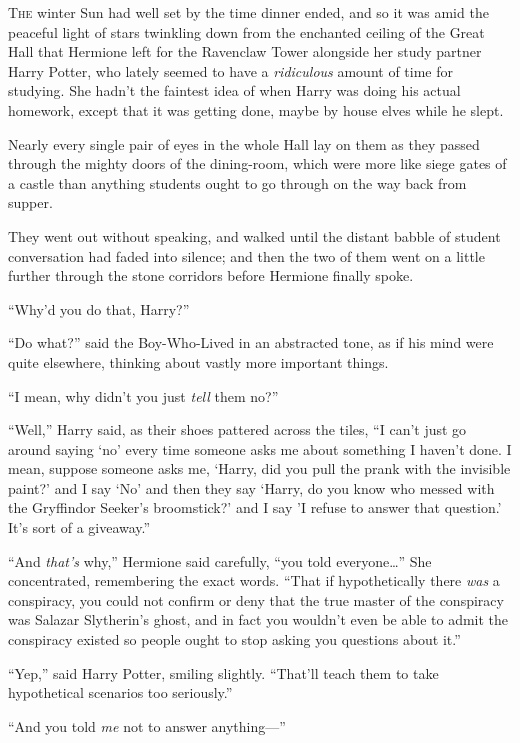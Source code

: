 
\lettrine{T}{he} winter Sun had well set by the time dinner ended, and so it was amid the peaceful light of stars twinkling down from the enchanted ceiling of the Great Hall that Hermione left for the Ravenclaw Tower alongside her study partner Harry Potter, who lately seemed to have a \emph{ridiculous} amount of time for studying. She hadn’t the faintest idea of when Harry was doing his actual homework, except that it was getting done, maybe by house elves while he slept.

Nearly every single pair of eyes in the whole Hall lay on them as they passed through the mighty doors of the dining-room, which were more like siege gates of a castle than anything students ought to go through on the way back from supper.

They went out without speaking, and walked until the distant babble of student conversation had faded into silence; and then the two of them went on a little further through the stone corridors before Hermione finally spoke.

“Why’d you do that, Harry?”

“Do what?” said the Boy-Who-Lived in an abstracted tone, as if his mind were quite elsewhere, thinking about vastly more important things.

“I mean, why didn’t you just \emph{tell} them no?”

“Well,” Harry said, as their shoes pattered across the tiles, “I can’t just go around saying ‘no’ every time someone asks me about something I haven’t done. I mean, suppose someone asks me, ‘Harry, did you pull the prank with the invisible paint?’ and I say ‘No’ and then they say ‘Harry, do you know who messed with the Gryffindor Seeker’s broomstick?’ and I say ’I refuse to answer that question.’ It’s sort of a giveaway.”

“And \emph{that’s} why,” Hermione said carefully, “you told everyone…” She concentrated, remembering the exact words. “That if hypothetically there \emph{was} a conspiracy, you could not confirm or deny that the true master of the conspiracy was Salazar Slytherin’s ghost, and in fact you wouldn’t even be able to admit the conspiracy existed so people ought to stop asking you questions about it.”

“Yep,” said Harry Potter, smiling slightly. “That’ll teach them to take hypothetical scenarios too seriously.”

“And you told \emph{me} not to answer anything—”

